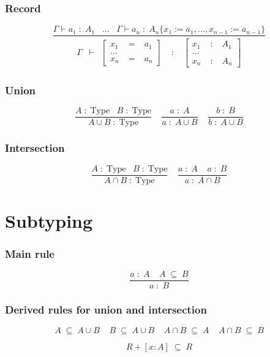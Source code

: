 \subsubsection*{Record}
\[
\frac{
    \Gamma \vdash a_{1} \;:\;  A_{1} 
         \;\;\;  \ldots \;\;\; 
    \Gamma \vdash a_{n} \;:\; A_{n} \{   x_{1} := a_{1} , \ldots , x_{n-1} := a_{n-1}  \}
}{
  \begin{array}{lclcl}
  \Gamma & \vdash &\left[\begin{array}{lcl}x_{1} & \;=\; & a_{1} \\ \ldots & \\ x_{n} & \;=\; &  a_{n}\end{array}\right] 
    & \;:\; & \left[\begin{array}{lcl}x_{1} & \;:\; & A_{1} \\ \ldots & \\ x_{n} & \;:\; & A_{n}\end{array}\right]
  \end{array}
}
\]


\subsubsection*{Union}
\[
\frac{
A \;:\; \mbox{Type} \;\;\;  B \;:\; \mbox{Type} 
}{
A\cup B \;:\; \mbox{Type} 
}
\;\;\;\;
\frac{
a \;:\;  A
}{
a \;:\; A\cup B
}
\;\;\;\;
\frac{
b \;:\;  B
}{
b \;:\; A\cup B
}
\]

\subsubsection*{Intersection}
\[
\frac{
A \;:\; \mbox{Type} \;\;\;  B \;:\; \mbox{Type} 
}{
A\cap B \;:\; \mbox{Type}
} 
\;\;\;\;
\frac{
a \;:\;  A \;\;\;\; a \;:\;  B
}{
a \;:\; A\cap B 
}
\]


\newpage


\section*{Subtyping}

\subsubsection*{Main rule}
\[
\frac{
a \;:\; A \;\;\;\; A \;\subseteq\;  B
}{
a \;:\; B
}
\]

\subsubsection*{Derived rules for union and intersection}
\[
A \;\subseteq\; A\cup B
\;\;\;\; 
B \;\subseteq\; A\cup B
\;\;\;\; 
A\cap B\;\subseteq\;A
\;\;\;\; 
A\cap B\;\subseteq\;B
\]

\[
R + [ x : A ] \;\subseteq\; R
\]



